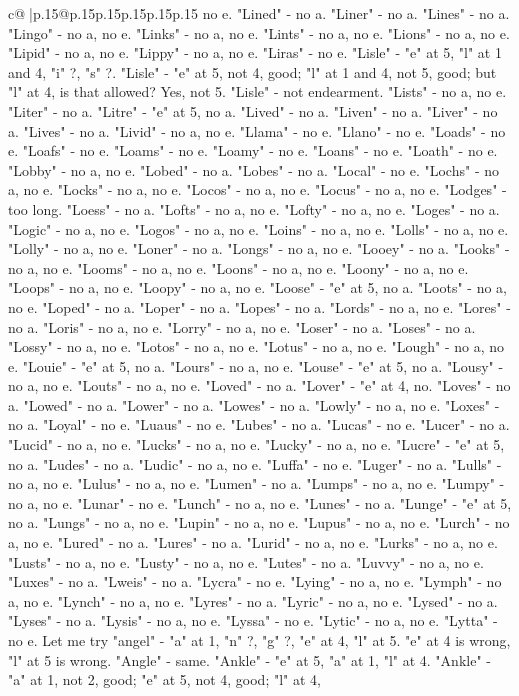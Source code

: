 \documentclass{article}
\begin{document}
{\begin{supertabular}{c@{$\;$}|p{.15\linewidth}@{}p{.15\linewidth}p{.15\linewidth}p{.15\linewidth}p{.15\linewidth}p{.15\linewidth}}
{{{no e. "Lined" {-} no a. "Liner" {-} no a. "Lines" {-} no a. "Lingo" {-} no a, no e. "Links" {-} no a, no e. "Lints" {-} no a, no e. "Lions" {-} no a, no e. "Lipid" {-} no a, no e. "Lippy" {-} no a, no e. "Liras" {-} no e. "Lisle" {-} "e" at 5, "l" at 1 and 4, "i" ?, "s" ?. "Lisle" {-} "e" at 5, not 4, good; "l" at 1 and 4, not 5, good; but "l" at 4, is that allowed? Yes, not 5. "Lisle" {-} not endearment. "Lists" {-} no a, no e. "Liter" {-} no a. "Litre" {-} "e" at 5, no a. "Lived" {-} no a. "Liven" {-} no a. "Liver" {-} no a. "Lives" {-} no a. "Livid" {-} no a, no e. "Llama" {-} no e. "Llano" {-} no e. "Loads" {-} no e. "Loafs" {-} no e. "Loams" {-} no e. "Loamy" {-} no e. "Loans" {-} no e. "Loath" {-} no e. "Lobby" {-} no a, no e. "Lobed" {-} no a. "Lobes" {-} no a. "Local" {-} no e. "Lochs" {-} no a, no e. "Locks" {-} no a, no e. "Locos" {-} no a, no e. "Locus" {-} no a, no e. "Lodges" {-} too long. "Loess" {-} no a. "Lofts" {-} no a, no e. "Lofty" {-} no a, no e. "Loges" {-} no a. "Logic" {-} no a, no e. "Logos" {-} no a, no e. "Loins" {-} no a, no e. "Lolls" {-} no a, no e. "Lolly" {-} no a, no e. "Loner" {-} no a. "Longs" {-} no a, no e. "Looey" {-} no a. "Looks" {-} no a, no e. "Looms" {-} no a, no e. "Loons" {-} no a, no e. "Loony" {-} no a, no e. "Loops" {-} no a, no e. "Loopy" {-} no a, no e. "Loose" {-} "e" at 5, no a. "Loots" {-} no a, no e. "Loped" {-} no a. "Loper" {-} no a. "Lopes" {-} no a. "Lords" {-} no a, no e. "Lores" {-} no a. "Loris" {-} no a, no e. "Lorry" {-} no a, no e. "Loser" {-} no a. "Loses" {-} no a. "Lossy" {-} no a, no e. "Lotos" {-} no a, no e. "Lotus" {-} no a, no e. "Lough" {-} no a, no e. "Louie" {-} "e" at 5, no a. "Lours" {-} no a, no e. "Louse" {-} "e" at 5, no a. "Lousy" {-} no a, no e. "Louts" {-} no a, no e. "Loved" {-} no a. "Lover" {-} "e" at 4, no. "Loves" {-} no a. "Lowed" {-} no a. "Lower" {-} no a. "Lowes" {-} no a. "Lowly" {-} no a, no e. "Loxes" {-} no a. "Loyal" {-} no e. "Luaus" {-} no e. "Lubes" {-} no a. "Lucas" {-} no e. "Lucer" {-} no a. "Lucid" {-} no a, no e. "Lucks" {-} no a, no e. "Lucky" {-} no a, no e. "Lucre" {-} "e" at 5, no a. "Ludes" {-} no a. "Ludic" {-} no a, no e. "Luffa" {-} no e. "Luger" {-} no a. "Lulls" {-} no a, no e. "Lulus" {-} no a, no e. "Lumen" {-} no a. "Lumps" {-} no a, no e. "Lumpy" {-} no a, no e. "Lunar" {-} no e. "Lunch" {-} no a, no e. "Lunes" {-} no a. "Lunge" {-} "e" at 5, no a. "Lungs" {-} no a, no e. "Lupin" {-} no a, no e. "Lupus" {-} no a, no e. "Lurch" {-} no a, no e. "Lured" {-} no a. "Lures" {-} no a. "Lurid" {-} no a, no e. "Lurks" {-} no a, no e. "Lusts" {-} no a, no e. "Lusty" {-} no a, no e. "Lutes" {-} no a. "Luvvy" {-} no a, no e. "Luxes" {-} no a. "Lweis" {-} no a. "Lycra" {-} no e. "Lying" {-} no a, no e. "Lymph" {-} no a, no e. "Lynch" {-} no a, no e. "Lyres" {-} no a. "Lyric" {-} no a, no e. "Lysed" {-} no a. "Lyses" {-} no a. "Lysis" {-} no a, no e. "Lyssa" {-} no e. "Lytic" {-} no a, no e. "Lytta" {-} no e. Let me try "angel" {-} "a" at 1, "n" ?, "g" ?, "e" at 4, "l" at 5. "e" at 4 is wrong, "l" at 5 is wrong. "Angle" {-} same. "Ankle" {-} "e" at 5, "a" at 1, "l" at 4. "Ankle" {-} "a" at 1, not 2, good; "e" at 5, not 4, good; "l" at 4, }}}
\end{supertabular}}
\end{document}
